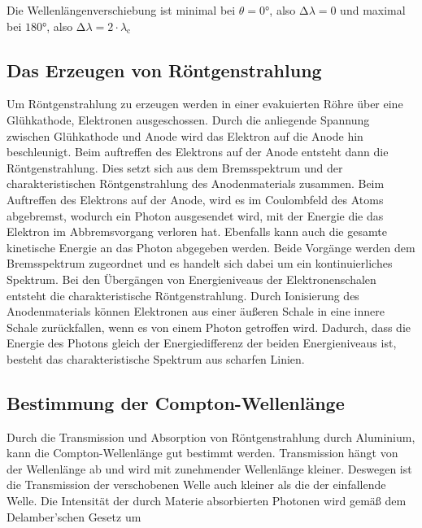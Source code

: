 \begin{flushleft}
    Die Wellenlängenverschiebung ist minimal bei $\theta = 0\unit{\degree}$, also $\increment \lambda = 0$  und maximal bei $180\unit{\degree}$, also $\increment \lambda = 2 \cdot \lambda_{\text{c}} $ 
\end{flushleft}

\subsection{Das Erzeugen von Röntgenstrahlung}

\begin{flushleft}
    Um Röntgenstrahlung zu erzeugen werden in einer evakuierten Röhre über eine Glühkathode, Elektronen ausgeschossen.
    Durch die anliegende Spannung zwischen Glühkathode und Anode wird das Elektron auf die Anode hin beschleunigt.
    Beim auftreffen des Elektrons auf der Anode entsteht dann die Röntgenstrahlung. 
    Dies setzt sich aus dem Bremsspektrum und der charakteristischen Röntgenstrahlung des Anodenmaterials zusammen.
    Beim Auftreffen des Elektrons auf der Anode, wird es im Coulombfeld des Atoms abgebremst, wodurch ein Photon ausgesendet wird, mit der Energie die das Elektron im Abbremsvorgang verloren hat.
    Ebenfalls kann auch die gesamte kinetische Energie an das Photon abgegeben werden. 
    Beide Vorgänge werden dem Bremsspektrum zugeordnet und es handelt sich dabei um ein kontinuierliches Spektrum.
    Bei den Übergängen von Energieniveaus der Elektronenschalen entsteht die charakteristische Röntgenstrahlung. 
    Durch Ionisierung des Anodenmaterials können Elektronen aus einer äußeren Schale in eine innere Schale zurückfallen, wenn es von einem Photon getroffen wird.
    Dadurch, dass die Energie des Photons gleich der Energiedifferenz der beiden Energieniveaus ist, besteht das charakteristische Spektrum aus scharfen Linien.
\end{flushleft}

\subsection{Bestimmung der Compton-Wellenlänge}

\begin{flushleft}
    Durch die Transmission und Absorption von Röntgenstrahlung durch Aluminium, kann die Compton-Wellenlänge gut bestimmt werden.
    Transmission hängt von der Wellenlänge ab und wird mit zunehmender Wellenlänge kleiner. 
    Deswegen ist die Transmission der verschobenen Welle auch kleiner als die der einfallende Welle.
    Die Intensität der durch Materie absorbierten Photonen wird gemäß dem Delamber'schen Gesetz um  
\end{flushleft}

